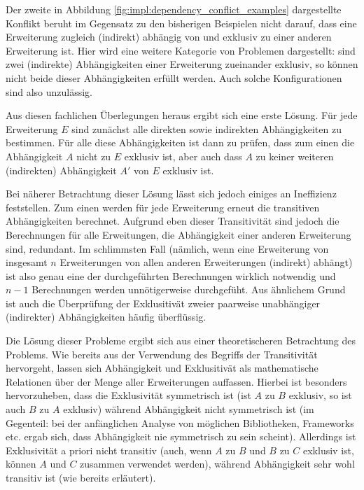 Der zweite in Abbildung \ref{fig:impl:dependency_conflict_examples} dargestellte Konflikt beruht im Gegensatz zu den bisherigen Beispielen nicht darauf, dass eine Erweiterung zugleich (indirekt) abhängig von und exklusiv zu einer anderen Erweiterung ist. Hier wird eine weitere Kategorie von Problemen dargestellt: sind zwei (indirekte) Abhängigkeiten einer Erweiterung zueinander exklusiv, so können nicht beide dieser Abhängigkeiten erfüllt werden. Auch solche Konfigurationen sind also unzulässig.

Aus diesen fachlichen Überlegungen heraus ergibt sich eine erste Lösung. Für jede Erweiterung $E$ sind zunächst alle direkten sowie indirekten Abhängigkeiten zu bestimmen. Für alle diese Abhängigkeiten ist dann zu prüfen, dass zum einen die Abhängigkeit $A$ nicht zu $E$ exklusiv ist, aber auch dass $A$ zu keiner weiteren (indirekten) Abhängigkeit $A'$ von $E$ exklusiv ist.

Bei näherer Betrachtung dieser Lösung lässt sich jedoch einiges an Ineffizienz feststellen. Zum einen werden für jede Erweiterung erneut die transitiven Abhängigkeiten berechnet. Aufgrund eben dieser Transitivität sind jedoch die Berechnungen für alle Erweitungen, die Abhängigkeit einer anderen Erweiterung sind, redundant. Im schlimmsten Fall (nämlich, wenn eine Erweiterung von insgesamt $n$ Erweiterungen von allen anderen Erweiterungen (indirekt) abhängt) ist also genau eine der durchgeführten Berechnungen wirklich notwendig und $n - 1$ Berechnungen werden unnötigerweise durchgefüht. Aus ähnlichem Grund ist auch die Überprüfung der Exklusitivät zweier paarweise unabhängiger (indirekter) Abhängigkeiten häufig überflüssig.

Die Lösung dieser Probleme ergibt sich aus einer theoretischeren Betrachtung des Problems. Wie bereits aus der Verwendung des Begriffs der Transitivität hervorgeht, lassen sich Abhängigkeit und Exklusitivät als mathematische Relationen über der Menge aller Erweiterungen auffassen. Hierbei ist besonders hervorzuheben, dass die Exklusivität symmetrisch ist (ist $A$ zu $B$ exklusiv, so ist auch $B$ zu $A$ exklusiv) während Abhängigkeit nicht symmetrisch ist (im Gegenteil: bei der anfänglichen Analyse von möglichen Bibliotheken, Frameworks etc. ergab sich, dass Abhängigkeit nie symmetrisch zu sein scheint). Allerdings ist Exklusivität a priori nicht transitiv (auch, wenn $A$ zu $B$ und $B$ zu $C$ exklusiv ist, können $A$ und $C$ zusammen verwendet werden), während Abhängigkeit sehr wohl transitiv ist (wie bereits erläutert).


